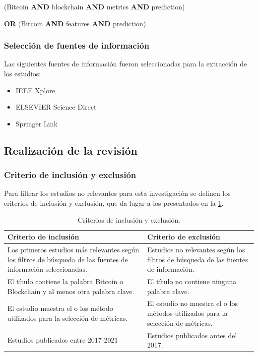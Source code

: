 \centerline{(Bitcoin \textbf{AND} blockchain \textbf{AND} metrics \textbf{AND} prediction)} 
\centerline{\textbf{OR} (Bitcoin \textbf{AND} features \textbf{AND} prediction)}

\subsubsection{Selección de fuentes de información}
Las siguientes fuentes de información fueron seleccionadas para la extracción de los estudios:\\
\vspace{-1cm}
\begin{itemize}
	\item IEEE Xplore
	\item ELSEVIER Science Direct
	\item Springer Link\\
\end{itemize}
\vspace{-1.5cm}
\subsection{Realización de la revisión}
\subsubsection{Criterio de inclusión y exclusión}
Para filtrar los estudios no relevantes para esta investigación se definen los criterios de inclusión y exclusión, que da lugar a los presentados en la \cref{tab:Table3}.\\

\begin{table}[h!]
	\centering
	\begin{tabular}{ | m{7cm}| m{7cm} | }
		\hline
		\textbf{Criterio de inclusión} & \textbf{Criterio de exclusión}\\
		\hline
		Los primeros estudios más relevantes según los filtros de búsqueda de las fuentes de información seleccionadas.& Estudios no relevantes según los filtros de búsqueda de las fuentes de información.\\
		\hline
		El título contiene la palabra Bitcoin o Blockchain y al menos otra palabra clave.&  El título no contiene ninguna palabra clave.\\ 
		\hline
		El estudio muestra el o los método utilizados para la selección de métricas.& El estudio no muestra el o los métodos utilizados para la selección de métricas.\\
		\hline
		Estudios publicados entre 2017-2021&Estudios publicados antes del 2017.\\
		\hline
	\end{tabular}
	\caption{Criterios de inclusión y exclusión.}
	\label{tab:Table3}
\end{table}

